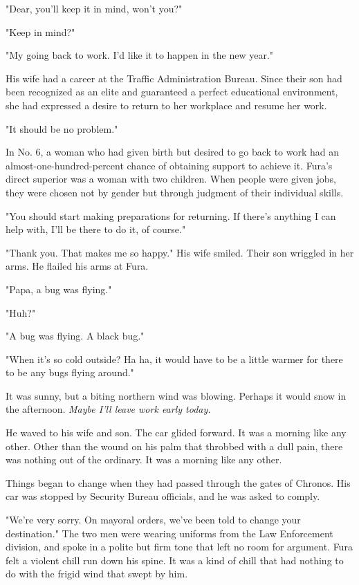 "Dear, you'll keep it in mind, won't you?"

"Keep in mind?"

"My going back to work. I'd like it to happen in the new year."

His wife had a career at the Traffic Administration Bureau. Since their
son had been recognized as an elite and guaranteed a perfect educational
environment, she had expressed a desire to return to her workplace and
resume her work.

"It should be no problem."

In No. 6, a woman who had given birth but desired to go back to work had
an almost-one-hundred-percent chance of obtaining support to achieve it.
Fura's direct superior was a woman with two children. When people were
given jobs, they were chosen not by gender but through judgment of their
individual skills.

"You should start making preparations for returning. If there's anything
I can help with, I'll be there to do it, of course."

"Thank you. That makes me so happy." His wife smiled. Their son wriggled
in her arms. He flailed his arms at Fura.

"Papa, a bug was flying."

"Huh?"

"A bug was flying. A black bug."

"When it's so cold outside? Ha ha, it would have to be a little warmer
for there to be any bugs flying around."

It was sunny, but a biting northern wind was blowing. Perhaps it would
snow in the afternoon. \emph{Maybe I'll leave work early today.}

He waved to his wife and son. The car glided forward. It was a morning
like any other. Other than the wound on his palm that throbbed with a
dull pain, there was nothing out of the ordinary. It was a morning like
any other.

Things began to change when they had passed through the gates of
Chronos. His car was stopped by Security Bureau officials, and he was
asked to comply.

"We're very sorry. On mayoral orders, we've been told to change your
destination." The two men were wearing uniforms from the Law Enforcement
division, and spoke in a polite but firm tone that left no room for
argument. Fura felt a violent chill run down his spine. It was a kind of
chill that had nothing to do with the frigid wind that swept by him.

